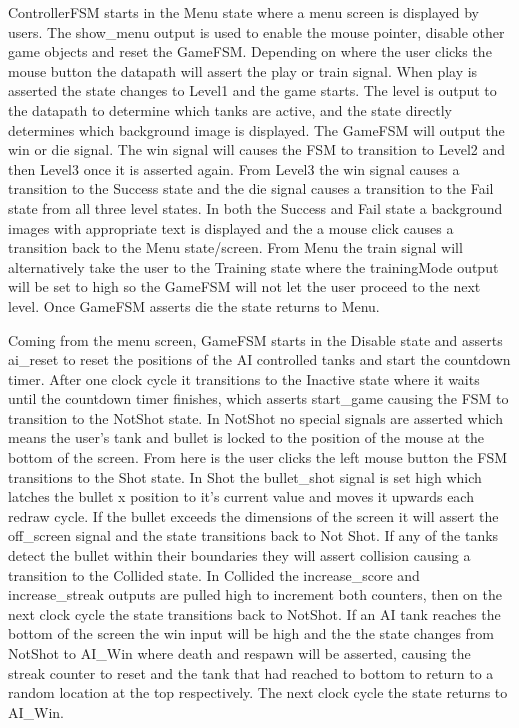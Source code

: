 \documentclass{article}
\begin{document}
ControllerFSM starts in the Menu state where a menu screen is displayed by users. The show_menu output is used to enable the mouse pointer, disable other game objects and reset the GameFSM. Depending on where the user clicks the mouse button the datapath will assert the play or train signal. When play is asserted the state changes to Level1 and the game starts. The level is output to the datapath to determine which tanks are active, and the state directly determines which background image is displayed. The GameFSM will output the win or die signal. The win signal will causes the FSM to transition to Level2 and then Level3 once it is asserted again. From Level3 the win signal causes a transition to the Success state and the die signal causes a transition to the Fail state from all three level states. In both the Success and Fail state a background images with appropriate text is displayed and the a mouse click causes a transition back to the Menu state/screen. From Menu the train signal will alternatively take the user to the Training state where the trainingMode output will be set to high so the GameFSM will not let the user proceed to the next level. Once GameFSM asserts die the state returns to Menu.

Coming from the menu screen, GameFSM starts in the Disable state and asserts ai_reset to reset the positions of the AI controlled tanks and start the countdown timer. After one clock cycle it transitions to the Inactive state where it waits until the countdown timer finishes, which asserts start_game causing the FSM to transition to the NotShot state. In NotShot no special signals are asserted which means the user's tank and bullet is locked to the position of the mouse at the bottom of the screen. From here is the user clicks the left mouse button the FSM transitions to the Shot state. In Shot the bullet_shot signal is set high which latches the bullet x position to it’s current value and moves it upwards each redraw cycle. If the bullet exceeds the dimensions of the screen it will assert the off_screen signal and the state transitions back to Not Shot. If any of the tanks detect the bullet within their boundaries they will assert collision causing a transition to the Collided state. In Collided the increase_score and increase_streak outputs are pulled high to increment both counters, then on the next clock cycle the state transitions back to NotShot. If an AI tank reaches the bottom of the screen the win input will be high and the the state changes from NotShot to AI_Win where death and respawn will be asserted, causing the streak counter to reset and the tank that had reached to bottom to return to a random location at the top respectively. The next clock cycle the state returns to AI_Win.
\end{document}
